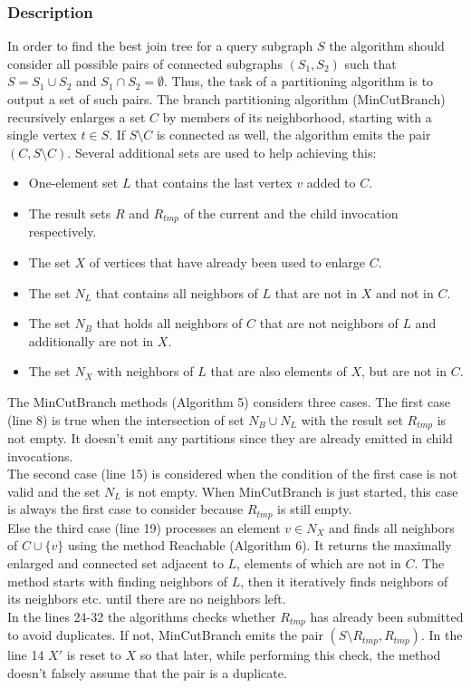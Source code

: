 \documentclass[10pt,journal,compsoc]{IEEEtran}
\begin{document}
\subsubsection{Description}
\indent In order to find the best join tree for a query subgraph $S$ the algorithm should consider all possible pairs of connected subgraphs $(S_1, S_2)$ such that $S = S_1 \cup S_2$ and $S_1 \cap S_2 = \emptyset$. Thus, the task of a partitioning algorithm is to output a set of such pairs. \newline
\indent The branch partitioning algorithm (MinCutBranch) recursively enlarges a set $C$ by members of its neighborhood, starting with a single vertex $t \in S$. If $S \setminus C$ is connected as well, the algorithm emits the pair $(C, S \setminus C)$. Several additional sets are used to help achieving this:
\begin{itemize} 
\item One-element set $L$ that contains the last vertex $v$ added to $C$.
\item The result sets $R$ and $R_{tmp}$ of the current and the child invocation respectively.
\item The set $X$ of vertices that have already been used to enlarge $C$.
\item The set $N_L$ that contains all neighbors of $L$ that are not in $X$ and not in $C$.
\item The set $N_B$ that holds all neighbors of $C$ that are not neighbors of $L$ and additionally are not in $X$.
\item The set $N_X$ with neighbors of $L$ that are also elements of $X$, but are not in $C$.
\end{itemize}

\indent The MinCutBranch methods (Algorithm 5) considers three cases. The first case (line 8) is true when the intersection of set $N_B \cup N_L$ with the result set $R_{tmp}$ is not empty. It doesn't emit any partitions since they are already emitted in child invocations. \\
\indent The second case (line 15) is considered when the condition of the first case is not valid and the set $N_L$ is not empty. When MinCutBranch is just started, this case is always the first case to consider because $R_{tmp}$ is still empty. \\
\indent Else the third case (line 19) processes an element $v \in N_X$ and finds all neighbors of $C \cup \{v\}$ using the method Reachable (Algorithm 6). It returns the maximally enlarged and connected set adjacent to $L$, elements of which are not in $C$. The method starts with finding neighbors of $L$, then it iteratively finds neighbors of its neighbors etc. until there are no neighbors left. \\
\indent In the lines 24-32 the algorithms checks whether $R_{tmp}$ has already been submitted to avoid duplicates. If not, MinCutBranch emits the pair $(S \setminus R_{tmp}, R_{tmp})$. In the line 14 $X'$ is reset to $X$ so that later, while performing this check, the method doesn't falsely assume that the pair is a duplicate.\\
\end{document}
